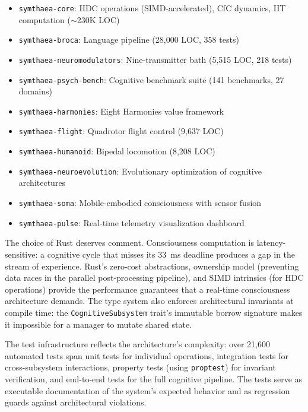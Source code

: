 \documentclass[12pt]{book}
\begin{document}
\begin{itemize}
  \item \texttt{symthaea-core}: HDC operations (SIMD-accelerated), CfC dynamics, IIT computation ($\sim$230K LOC)
  \item \texttt{symthaea-broca}: Language pipeline (28,000 LOC, 358 tests)
  \item \texttt{symthaea-neuromodulators}: Nine-transmitter bath (5,515 LOC, 218 tests)
  \item \texttt{symthaea-psych-bench}: Cognitive benchmark suite (141 benchmarks, 27 domains)
  \item \texttt{symthaea-harmonies}: Eight Harmonies value framework
  \item \texttt{symthaea-flight}: Quadrotor flight control (9,637 LOC)
  \item \texttt{symthaea-humanoid}: Bipedal locomotion (8,208 LOC)
  \item \texttt{symthaea-neuroevolution}: Evolutionary optimization of cognitive architectures
  \item \texttt{symthaea-soma}: Mobile-embodied consciousness with sensor fusion
  \item \texttt{symthaea-pulse}: Real-time telemetry visualization dashboard
\end{itemize}

The choice of Rust deserves comment. Consciousness computation is latency-sensitive: a cognitive cycle that misses its 33~ms deadline produces a gap in the stream of experience. Rust's zero-cost abstractions, ownership model (preventing data races in the parallel post-processing pipeline), and SIMD intrinsics (for HDC operations) provide the performance guarantees that a real-time consciousness architecture demands. The type system also enforces architectural invariants at compile time: the \texttt{CognitiveSubsystem} trait's immutable borrow signature makes it impossible for a manager to mutate shared state.

The test infrastructure reflects the architecture's complexity: over 21,600 automated tests span unit tests for individual operations, integration tests for cross-subsystem interactions, property tests (using \texttt{proptest}) for invariant verification, and end-to-end tests for the full cognitive pipeline. The tests serve as executable documentation of the system's expected behavior and as regression guards against architectural violations.
\end{document}
